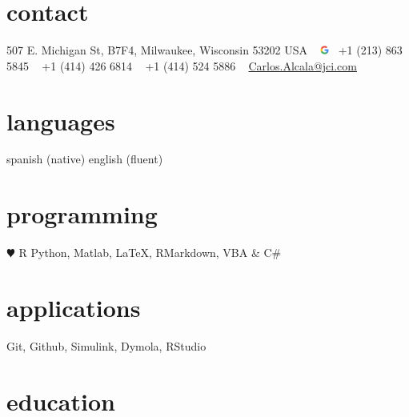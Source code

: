 \documentclass[]{../friggeri-cv} %
\begin{document}


\begin{aside} %
\section{contact}
507 E. Michigan St,
B7F4,
Milwaukee, Wisconsin 53202
USA
~
\includegraphics[width = 8pt]{../../figures/google-icon.png}~ +1 (213) 863 5845
\Mobilefone~ +1 (414) 426 6814
\Telefon~ +1 (414) 524 5886
~
\href{mailto:Carlos.Alcala@jci.com}{Carlos.Alcala@jci.com}
\section{languages}
spanish (native)
english (fluent)
\section{programming}
{\color{red} $\varheartsuit$} R
Python, Matlab,
\LaTeX, RMarkdown,
VBA \& C\#
\section{applications}
Git, Github,
Simulink, Dymola,
RStudio
\end{aside}


\section{education}
\end{document}

